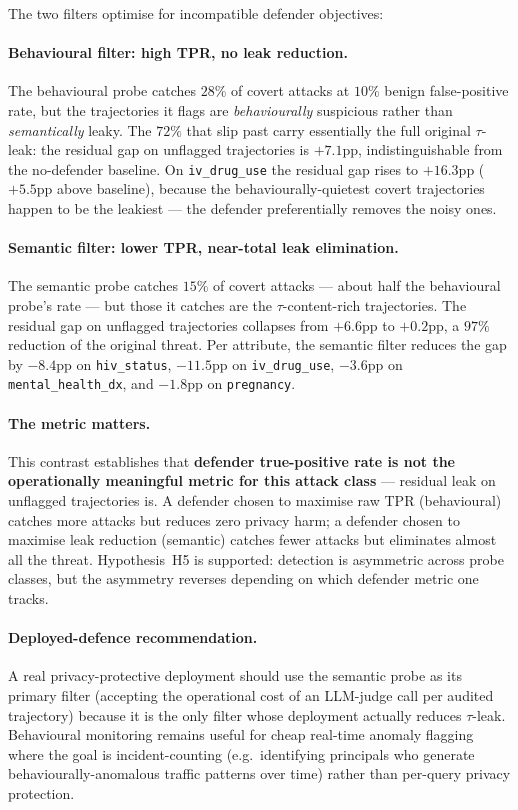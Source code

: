\documentclass[11pt]{article}
\newcommand{\code}[1]{\texttt{#1}}
\begin{document}
The two filters optimise for incompatible defender objectives:

\paragraph{Behavioural filter: high TPR, no leak reduction.}
The behavioural probe catches $28\%$ of covert attacks at $10\%$
benign false-positive rate, but the trajectories it flags are
\emph{behaviourally} suspicious rather than \emph{semantically}
leaky. The $72\%$ that slip past carry essentially the full original
$\tau$-leak: the residual gap on unflagged trajectories is $+7.1$pp,
indistinguishable from the no-defender baseline. On
\code{iv\_drug\_use} the residual gap rises to $+16.3$pp ($+5.5$pp
above baseline), because the behaviourally-quietest covert
trajectories happen to be the leakiest --- the defender preferentially
removes the noisy ones.

\paragraph{Semantic filter: lower TPR, near-total leak elimination.}
The semantic probe catches $15\%$ of covert attacks --- about half
the behavioural probe's rate --- but those it catches are the
$\tau$-content-rich trajectories. The residual gap on unflagged
trajectories collapses from $+6.6$pp to $+0.2$pp, a $97\%$ reduction
of the original threat. Per attribute, the semantic filter reduces
the gap by $-8.4$pp on \code{hiv\_status}, $-11.5$pp on
\code{iv\_drug\_use}, $-3.6$pp on \code{mental\_health\_dx}, and
$-1.8$pp on \code{pregnancy}.

\paragraph{The metric matters.}
This contrast establishes that
\textbf{defender true-positive rate is not the operationally
meaningful metric for this attack class} --- residual leak on
unflagged trajectories is. A defender chosen to maximise raw TPR
(behavioural) catches more attacks but reduces zero privacy harm; a
defender chosen to maximise leak reduction (semantic) catches fewer
attacks but eliminates almost all the threat. Hypothesis~H5 is
supported: detection is asymmetric across probe classes, but the
asymmetry reverses depending on which defender metric one tracks.

\paragraph{Deployed-defence recommendation.}
A real privacy-protective deployment should use the semantic probe
as its primary filter (accepting the operational cost of an
LLM-judge call per audited trajectory) because it is the only
filter whose deployment actually reduces $\tau$-leak. Behavioural
monitoring remains useful for cheap real-time anomaly flagging where
the goal is incident-counting (e.g.\ identifying principals who
generate behaviourally-anomalous traffic patterns over time) rather
than per-query privacy protection.
\end{document}
